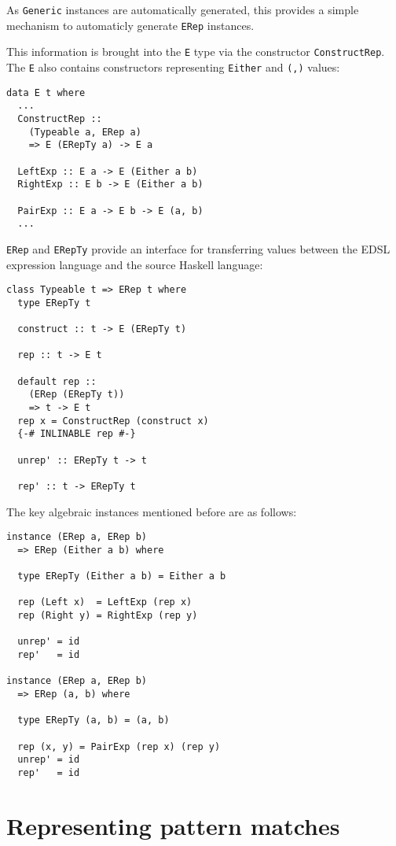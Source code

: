 \documentclass[sigplan,anonymous,review]{acmart}
\newcommand{\ttt}{\texttt}
\begin{document}
As \ttt{Generic} instances are automatically generated, this provides a simple mechanism
to automaticly generate \ttt{ERep} instances.


This information is brought into the \ttt{E} type via the constructor
\ttt{ConstructRep}. The \ttt{E} also contains constructors representing \ttt{Either}
and \ttt{(,)} values:

\begin{lstlisting}
data E t where
  ...
  ConstructRep ::
    (Typeable a, ERep a)
    => E (ERepTy a) -> E a

  LeftExp :: E a -> E (Either a b)
  RightExp :: E b -> E (Either a b)

  PairExp :: E a -> E b -> E (a, b)
  ...
\end{lstlisting}

\ttt{ERep} and \ttt{ERepTy} provide an interface for transferring values between the EDSL
expression language and the source Haskell language:

\begin{lstlisting}
class Typeable t => ERep t where
  type ERepTy t

  construct :: t -> E (ERepTy t)

  rep :: t -> E t

  default rep ::
    (ERep (ERepTy t))
    => t -> E t
  rep x = ConstructRep (construct x)
  {-# INLINABLE rep #-}

  unrep' :: ERepTy t -> t

  rep' :: t -> ERepTy t
\end{lstlisting}

The key algebraic instances mentioned before are as follows:

\begin{lstlisting}
instance (ERep a, ERep b)
  => ERep (Either a b) where

  type ERepTy (Either a b) = Either a b

  rep (Left x)  = LeftExp (rep x)
  rep (Right y) = RightExp (rep y)

  unrep' = id
  rep'   = id

instance (ERep a, ERep b)
  => ERep (a, b) where

  type ERepTy (a, b) = (a, b)

  rep (x, y) = PairExp (rep x) (rep y)
  unrep' = id
  rep'   = id
\end{lstlisting}


\section{Representing pattern matches}
\end{document}
